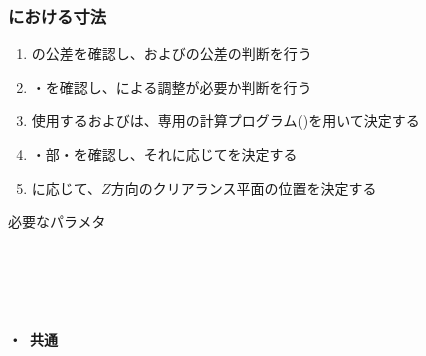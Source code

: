 \subsubsection{\EndFacecutMilling における寸法}
\begin{enumerate}[label=\sarrow]
\item {}\nameWorkTotalLength の公差を確認し、\TopAlocationLength および\BottomAlocationLength の公差の判断を行う
\item \TopAlocationLength・\BottomAlocationLength を確認し、\Spacer による調整が必要か判断を行う
\item 使用する\Spacer および\ReAlocationLength は、専用の計算プログラム(\linkExcelVBA)を用いて決定する
\item \OuterDiameter・\nameEndFace 部\nameThickness・\EndFaceOuterCornerR を確認し、それに応じて\TDCValue を決定する
\item \ReAlocationLength に応じて、$Z$方向のクリアランス平面の位置を決定する
\end{enumerate}
\begin{Parameter}{必要なパラメタ}
\paragraph*{\ReAlocationLength}
\PMWorkTotalLength
\PMTopAlocationLength
\PMBottomAlocationLength
\PMACOD
\PMJigLength
{}
\tcbline*
\paragraph*{\TopEndFacecut}
\PMTopReAlocationLength
\PMACOD
\PMBDOD
\PMODCornerR\\
\PMTopEndACID
\PMTopEndBDID
{}
\tcbline*
\paragraph*{\BottomEndFacecut}
\PMBottomReAlocationLength
\PMACOD
\PMBDOD
\PMODCornerR\\
\PMBottomEndACID
\PMBottomEndBDID
{}
\tcbline*
\paragraph*{\TopEndFacecut・\BottomEndFacecut~共通}
\end{Parameter}

